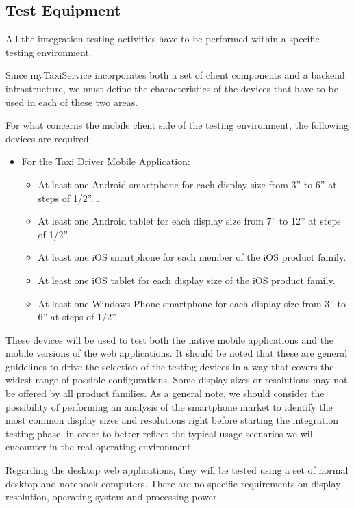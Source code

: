 \subsection{Test Equipment}
All the integration testing activities have to be performed within a specific testing environment. 

Since myTaxiService incorporates both a set of client components and a backend infrastructure, we must define the characteristics of the devices that have to be used in each of these two areas.

For what concerns the mobile client side of the testing environment, the following devices are required:
\begin{itemize}
	\item For the Taxi Driver Mobile Application:
		\begin{itemize}
		\item At least one Android smartphone for each display size from 3” to 6” at steps of 1/2”. .
		\item At least one Android tablet for each display size from 7” to 12” at steps of 1/2”. 
		\item At least one iOS smartphone for each member of the iOS product family.
		\item At least one iOS tablet for each display size of the iOS product family.
		\item At least one Windows Phone smartphone for each display size from 3” to 6” at steps of 1/2”. 
		\end{itemize}
\end{itemize}
These devices will be used to test both the native mobile applications and the mobile versions of the web applications.
It should be noted that these are general guidelines to drive the selection of the testing devices in a way that covers the widest range of possible configurations. Some display sizes or resolutions may not be offered by all product families. 
As a general note, we should consider the possibility of performing an analysis of the smartphone market to identify the most common display sizes and resolutions right before starting the integration testing phase, in order to better reflect the typical usage scenarios we will encounter in the real operating environment. 

Regarding the desktop web applications, they will be tested using a set of normal desktop and notebook computers. There are no specific requirements on display resolution, operating system and processing power.

